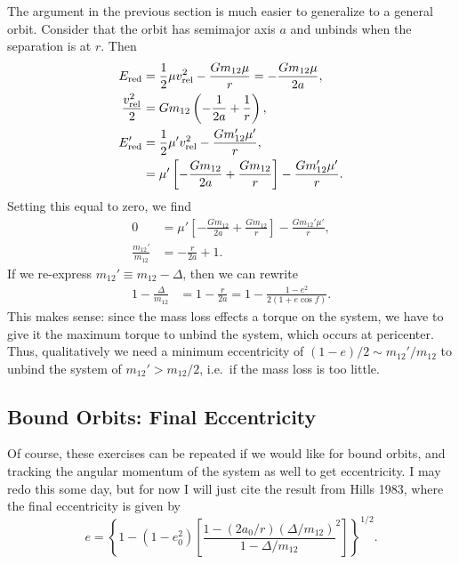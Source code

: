\documentclass[12pt]{article}
\newcommand*{\p}[1]{\left(#1\right)}
\newcommand*{\s}[1]{\left[#1\right]}
\newcommand*{\z}[1]{\left\{#1\right\}}
\begin{document}
The argument in the previous section is much easier to generalize to a general
orbit. Consider that the orbit has semimajor axis $a$ and unbinds when the
separation is at $r$. Then
\begin{align*}
    E_{\rm red} &= \frac{1}{2}\mu v_{\rm rel}^2
        - \frac{Gm_{12}\mu}{r} = -\frac{Gm_{12}\mu}{2a},\\
    \frac{v_{\rm rel}^2}{2} &= Gm_{12}\p{-\frac{1}{2a} + \frac{1}{r}},\\
    E_{\rm red}' &= \frac{1}{2}\mu' v_{\rm rel}^2 - \frac{Gm_{12}'\mu'}{r},\\
        &= \mu'\s{-\frac{Gm_{12}}{2a} + \frac{Gm_{12}}{r}}
            - \frac{Gm_{12}'\mu'}{r}.
\end{align*}
Setting this equal to zero, we find
\begin{align}
    0 &= \mu'\s{-\frac{Gm_{12}}{2a} + \frac{Gm_{12}}{r}}
            - \frac{Gm_{12}'\mu'}{r},\\
    \frac{m_{12}'}{m_{12}} &= -\frac{r}{2a} + 1.
\end{align}
If we re-express $m_{12}' \equiv m_{12} - \Delta$, then we can rewrite
\begin{align}
    1 - \frac{\Delta}{m_{12}} &= 1 - \frac{r}{2a}
        = 1 - \frac{1 - e^2}{2\p{1 + e\cos f}}.
\end{align}
This makes sense: since the mass loss effects a torque on the system, we have to
give it the maximum torque to unbind the system, which occurs at pericenter.
Thus, qualitatively we need a minimum eccentricity of $(1 - e) / 2 \sim m_{12}'
/ m_{12}$ to unbind the system of $m_{12}' > m_{12} / 2$, i.e.\ if the mass loss
is too little.

\subsection{Bound Orbits: Final Eccentricity}

Of course, these exercises can be repeated if we would like for bound orbits,
and tracking the angular momentum of the system as well to get eccentricity.
I may redo this some day, but for now I will just cite the result from Hills
1983, where the final eccentricity is given by
\begin{equation}
    e = \z{1 - (1 - e_0^2)\s{\frac{1 - (2a_0/r)(\Delta / m_{12})}{
        1 - \Delta / m_{12}}^2}}^{1/2}.
\end{equation}
\end{document}
